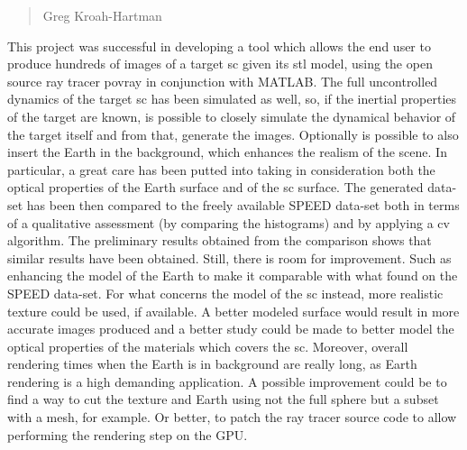 \begin{quotation}
  {\footnotesize
    \begin{flushright}
      Greg Kroah-Hartman
    \end{flushright}
  }
\end{quotation}
\vspace{0.5cm}

This project was successful in developing a tool which allows the end user to produce hundreds of images of a target \acrshort{sc} given its \acrshort{stl} model, using the open source ray tracer \acrshort{povray} in conjunction with MATLAB. The full uncontrolled dynamics of the target \acrshort{sc} has been simulated as well, so, if the inertial properties of the target are known, is possible to closely simulate the dynamical behavior of the target itself and from that, generate the images. Optionally is possible to also insert the Earth in the background, which enhances the realism of the scene. In particular, a great care has been putted into taking in consideration both the optical properties of the Earth surface and of the \acrshort{sc} surface.
The generated data-set has been then compared to the freely available SPEED data-set both in terms of a qualitative assessment (by comparing the histograms) and by applying a \acrshort{cv} algorithm.
The preliminary results obtained from the comparison shows that similar results have been obtained.
Still, there is room for improvement. Such as enhancing the model of the Earth to make it comparable with what found on the SPEED data-set. For what concerns the model of the \acrshort{sc} instead, more realistic texture could be used, if available. A better modeled surface would result in more accurate images produced and a better study could be made to better model the optical properties of the materials which covers the \acrshort{sc}. Moreover, overall rendering times when the Earth is in background are really long, as Earth rendering is a high demanding application. A possible improvement could be to find a way to cut the texture and Earth using not the full sphere but a subset with a mesh, for example. Or better, to patch the ray tracer source code to allow performing the rendering step on the GPU.
